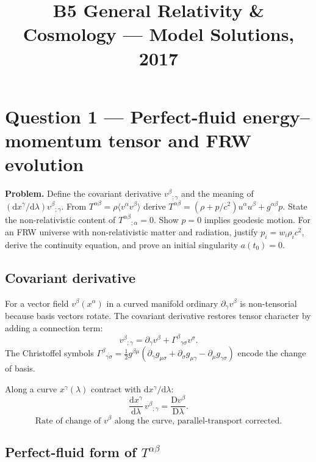 \documentclass[11pt]{article}
\title{B5 General Relativity \& Cosmology --- Model Solutions, 2017}
\author{}
\date{}
\newcommand{\D}{\mathrm{D}}
\newcommand{\de}{\mathrm{d}}
\begin{document}
\maketitle

\section*{Question 1 --- Perfect-fluid energy--momentum tensor and FRW evolution}

\textbf{Problem.} Define the covariant derivative $v^{\beta}{}_{;\gamma}$ and the meaning of $(\de x^{\gamma}/\de\lambda)v^{\beta}{}_{;\gamma}$. From $T^{\alpha\beta}=\rho\langle v^{\alpha}v^{\beta}\rangle$ derive $T^{\alpha\beta}=(\rho+p/c^{2})u^{\alpha}u^{\beta}+g^{\alpha\beta}p$. State the non-relativistic content of $T^{\alpha\beta}{}_{;\alpha}=0$. Show $p=0$ implies geodesic motion. For an FRW universe with non-relativistic matter and radiation, justify $p_{i}=w_{i}\rho_{i}c^{2}$, derive the continuity equation, and prove an initial singularity $a(t_{0})=0$.

\subsection*{Covariant derivative}

For a vector field $v^{\beta}(x^{\alpha})$ in a curved manifold ordinary $\partial_{\gamma}v^{\beta}$ is non-tensorial because basis vectors rotate. The covariant derivative restores tensor character by adding a connection term:
\[ v^{\beta}{}_{;\gamma} = \partial_{\gamma}v^{\beta} + \Gamma^{\beta}{}_{\gamma\sigma}v^{\sigma}. \]
The Christoffel symbols $\Gamma^{\beta}{}_{\gamma\sigma}=\tfrac12 g^{\beta\mu}(\partial_{\gamma}g_{\mu\sigma}+\partial_{\sigma}g_{\mu\gamma}-\partial_{\mu}g_{\gamma\sigma})$ encode the change of basis.

Along a curve $x^{\gamma}(\lambda)$ contract with $\de x^{\gamma}/\de\lambda$:
\[ \frac{\de x^{\gamma}}{\de\lambda}\,v^{\beta}{}_{;\gamma} = \frac{\D v^{\beta}}{\D\lambda}. \]
\[ \boxed{\;\text{Rate of change of }v^{\beta}\text{ along the curve, parallel-transport corrected.}\;} \]

\subsection*{Perfect-fluid form of $T^{\alpha\beta}$}
\end{document}
